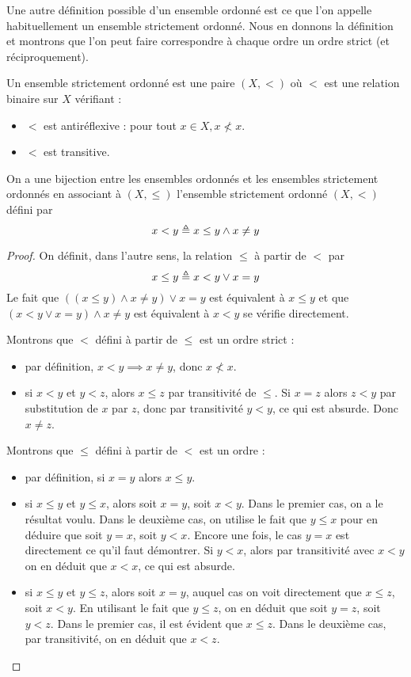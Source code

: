 Une autre définition possible d'un ensemble ordonné est ce que l'on appelle
habituellement un ensemble strictement ordonné. Nous en donnons la définition et
montrons que l'on peut faire correspondre à chaque ordre un ordre strict (et
réciproquement).

\begin{definition}
  Un ensemble strictement ordonné est une paire $(X,<)$ où $<$ est une relation
  binaire sur $X$ vérifiant :
  \begin{itemize}
  \item $<$ est antiréflexive : pour tout $x\in X, x\not< x$.
  \item $<$ est transitive.
  \end{itemize}
\end{definition}

\begin{proposition}
  On a une bijection entre les ensembles ordonnés et les ensembles strictement
  ordonnés en associant à $(X,\leq)$ l'ensemble strictement ordonné $(X,<)$
  défini par
  \[x < y \triangleq x \leq y \land x \neq y\]
\end{proposition}

\begin{proof}
  On définit, dans l'autre sens, la relation $\leq$ à partir de $<$ par
  \[x\leq y \triangleq x < y \lor x = y\]
  Le fait que $((x \leq y)\land x \neq y) \lor x = y$ est équivalent à $x\leq y$
  et que $(x < y\lor x = y) \land x \neq y$ est équivalent à $x < y$ se vérifie
  directement.

  Montrons que $<$ défini à partir de $\leq$ est un ordre strict :
  \begin{itemize}
  \item par définition, $x < y\implies x \neq y$, donc $x\not< x$.
  \item si $x < y$ et $y < z$, alors $x \leq z$ par transitivité de $\leq$.
    Si $x = z$ alors $z < y$ par substitution de $x$ par $z$, donc par
    transitivité $y < y$, ce qui est absurde. Donc $x \neq z$.
  \end{itemize}

  Montrons que $\leq$ défini à partir de $<$ est un ordre :
  \begin{itemize}
  \item par définition, si $x = y$ alors $x\leq y$.
  \item si $x\leq y$ et $y\leq x$, alors soit $x = y$, soit $x < y$. Dans le
    premier cas, on a le résultat voulu. Dans le deuxième cas, on utilise le
    fait que $y\leq x$ pour en déduire que soit $y = x$, soit $y < x$. Encore
    une fois, le cas $y = x$ est directement ce qu'il faut démontrer.
    Si $y < x$, alors par transitivité avec $x < y$ on en déduit que $x < x$,
    ce qui est absurde.
  \item si $x \leq y$ et $y \leq z$, alors soit $x = y$, auquel cas on voit
    directement que $x\leq z$, soit $x < y$. En utilisant le fait que
    $y \leq z$, on en déduit que soit $y = z$, soit $y < z$. Dans le premier
    cas, il est évident que $x \leq z$. Dans le deuxième cas, par transitivité,
    on en déduit que $x < z$.
  \end{itemize}
\end{proof}

